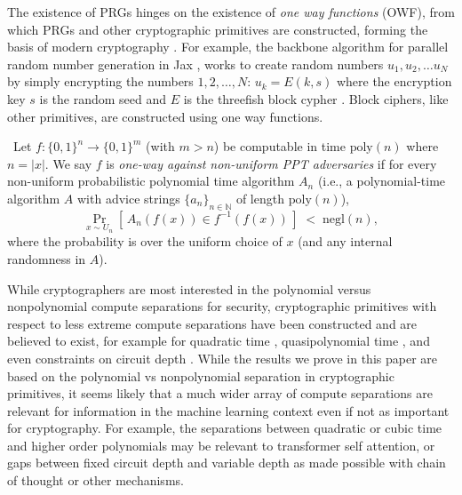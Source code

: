 \documentclass[twoside]{article}
\begin{document}
The existence of PRGs hinges on the existence of \emph{one way functions} (OWF), from which PRGs and other cryptographic primitives are constructed, forming the basis of modern cryptography \citep{goldreich1989hard}. For example, the backbone algorithm for parallel random number generation in Jax \citep{jax2018github}, works to create random numbers $u_1,u_2,\dots u_N$ by simply encrypting the numbers $1,2,\dots, N$: $u_k = E(k,s)$ where the encryption key $s$ is the random seed and $E$ is the threefish block cypher \citep{salmon2011parallel}. Block ciphers, like other primitives, are constructed using one way functions.

%
%
%
%
%
%
%

\begin{definition}\label{def:owf} \
Let \(f:\{0,1\}^n \to \{0,1\}^m\) (with $m>n$) be computable in time \(\mathrm{poly}(n)\) where \(n=|x|\).
We say \(f\) is \emph{one-way against non-uniform PPT adversaries} if for every non-uniform probabilistic polynomial time
algorithm \(A_n\) (i.e., a polynomial-time algorithm $A$ with advice strings \(\{a_n\}_{n\in\mathbb{N}}\) of length \(\mathrm{poly}(n)\)),
\[
\Pr_{x \sim U_n}\!\left[\, A_n(f(x)) \in f^{-1}(f(x)) \,\right] \;<\; \mathrm{negl}(n),
\]
where the probability is over the uniform choice of \(x\) (and any internal randomness in \(A\)).%
%
%
%
%
%
\end{definition}


While cryptographers are most interested in the polynomial versus nonpolynomial compute separations for security, cryptographic primitives with respect to less extreme compute separations have been constructed and are believed to exist, for example for quadratic time \citep{merkle1978secure}, quasipolynomial time \citep{liu2024direct}, and even constraints on circuit depth \citep{applebaum2016cryptographic}. While the results we prove in this paper are based on the polynomial vs nonpolynomial separation in cryptographic primitives, it seems likely that a much wider array of compute separations are relevant for information in the machine learning context even if not as important for cryptography. For example, the separations between quadratic or cubic time and higher order polynomials may be relevant to transformer self attention, or gaps between fixed circuit depth and variable depth as made possible with chain of thought or other mechanisms.
%
%


%
%
\end{document}
